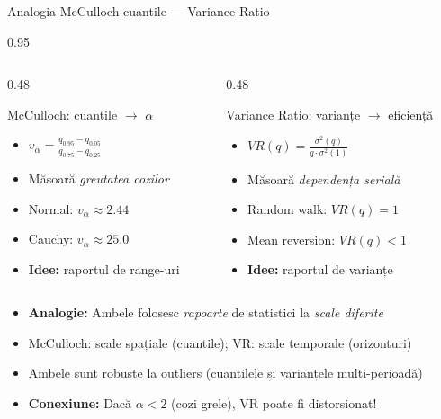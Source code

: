 \documentclass[9pt, aspectratio=169, t]{beamer}
\begin{document}
\begin{frame}{Analogia McCulloch cuantile --- Variance Ratio}
    \begin{cminipage}{0.95\textwidth}
\begin{columns}[T]
\begin{column}{0.48\textwidth}
\begin{block}{McCulloch: cuantile $\to$ $\alpha$}
\begin{itemize}\setlength{\itemsep}{0pt}
    \item $v_\alpha = \frac{q_{0.95} - q_{0.05}}{q_{0.75} - q_{0.25}}$
    \item Măsoară \textit{greutatea cozilor}
    \item Normal: $v_\alpha \approx 2.44$
    \item Cauchy: $v_\alpha \approx 25.0$
    \item \textbf{Idee:} raportul de range-uri
\end{itemize}
\end{block}
\end{column}
\begin{column}{0.48\textwidth}
\begin{block}{Variance Ratio: varianțe $\to$ eficiență}
\begin{itemize}\setlength{\itemsep}{0pt}
    \item $VR(q) = \frac{\sigma^2(q)}{q \cdot \sigma^2(1)}$
    \item Măsoară \textit{dependența serială}
    \item Random walk: $VR(q) = 1$
    \item Mean reversion: $VR(q) < 1$
    \item \textbf{Idee:} raportul de varianțe
\end{itemize}
\end{block}
\end{column}
\end{columns}

\vspace{0.3cm}
\begin{itemize}\setlength{\itemsep}{0pt}
    \item \textbf{Analogie:} Ambele folosesc \textit{rapoarte} de statistici la \textit{scale diferite}
    \item McCulloch: scale spațiale (cuantile); VR: scale temporale (orizonturi)
    \item Ambele sunt robuste la outliers (cuantilele și varianțele multi-perioadă)
    \item \textbf{Conexiune:} Dacă $\alpha < 2$ (cozi grele), VR poate fi distorsionat!
\end{itemize}
    \end{cminipage}
\end{frame}
\end{document}
